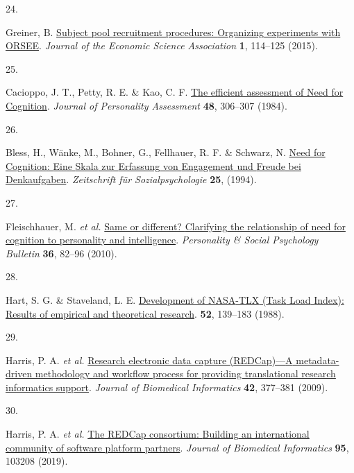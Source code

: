 \documentclass[
  man,floatsintext]{apa6}
\newlength{\cslhangindent}
\newlength{\csllabelwidth}
\newlength{\cslentryspacingunit} %
\newenvironment{CSLReferences}[2] %
 {%
  \setlength{\parindent}{0pt}
  \ifodd #1
  \let\oldpar\par
  \def\par{\hangindent=\cslhangindent\oldpar}
  \fi
  \setlength{\parskip}{#2\cslentryspacingunit}
 }%
 {}
\newcommand{\CSLLeftMargin}[1]{\parbox[t]{\csllabelwidth}{#1}}
\newcommand{\CSLRightInline}[1]{\parbox[t]{\linewidth - \csllabelwidth}{#1}\break}
\begin{document}
\begin{CSLReferences}{0}{0}
\leavevmode{}%
\CSLLeftMargin{24. }%
\CSLRightInline{Greiner, B. \href{https://doi.org/10.1007/s40881-015-0004-4}{Subject pool recruitment procedures: {Organizing} experiments with {ORSEE}}. \emph{Journal of the Economic Science Association} \textbf{1}, 114--125 (2015).}

\leavevmode{}%
\CSLLeftMargin{25. }%
\CSLRightInline{Cacioppo, J. T., Petty, R. E. \& Kao, C. F. \href{https://doi.org/10.1207/s15327752jpa4803_13}{The efficient assessment of {Need} for {Cognition}}. \emph{Journal of Personality Assessment} \textbf{48}, 306--307 (1984).}

\leavevmode{}%
\CSLLeftMargin{26. }%
\CSLRightInline{Bless, H., Wänke, M., Bohner, G., Fellhauer, R. F. \& Schwarz, N. \href{https://doi.org/1779110}{Need for {Cognition}: {Eine} {Skala} zur {Erfassung} von {Engagement} und {Freude} bei {Denkaufgaben}}. \emph{Zeitschrift für Sozialpsychologie} \textbf{25}, (1994).}

\leavevmode{}%
\CSLLeftMargin{27. }%
\CSLRightInline{Fleischhauer, M. \emph{et al.} \href{https://doi.org/10.1177/0146167209351886}{Same or different? {Clarifying} the relationship of need for cognition to personality and intelligence}. \emph{Personality \& Social Psychology Bulletin} \textbf{36}, 82--96 (2010).}

\leavevmode{}%
\CSLLeftMargin{28. }%
\CSLRightInline{Hart, S. G. \& Staveland, L. E. \href{https://doi.org/10.1016/S0166-4115(08)62386-9}{Development of {NASA}-{TLX} ({Task} {Load} {Index}): {Results} of empirical and theoretical research}. \textbf{52}, 139--183 (1988).}

\leavevmode{}%
\CSLLeftMargin{29. }%
\CSLRightInline{Harris, P. A. \emph{et al.} \href{https://doi.org/10.1016/j.jbi.2008.08.010}{Research electronic data capture ({REDCap})---{A} metadata-driven methodology and workflow process for providing translational research informatics support}. \emph{Journal of Biomedical Informatics} \textbf{42}, 377--381 (2009).}

\leavevmode{}%
\CSLLeftMargin{30. }%
\CSLRightInline{Harris, P. A. \emph{et al.} \href{https://doi.org/10.1016/j.jbi.2019.103208}{The {REDCap} consortium: {Building} an international community of software platform partners}. \emph{Journal of Biomedical Informatics} \textbf{95}, 103208 (2019).}


\end{CSLReferences}
\end{document}
